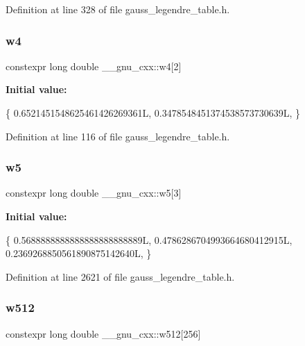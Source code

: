 Definition at line 328 of file gauss\+\_\+legendre\+\_\+table.\+h.

\mbox{\label{namespace____gnu__cxx_aed9d2cb808e1d273a3d11b6e1a3ac3f6}} 
\subsubsection{\texorpdfstring{w4}{w4}}
{\footnotesize\ttfamily constexpr long double \+\_\+\+\_\+gnu\+\_\+cxx\+::w4\mbox{[}2\mbox{]}}

{\bfseries Initial value\+:}
\begin{DoxyCode}
\{
    0.6521451548625461426269361L,
    0.3478548451374538573730639L,
  \}
\end{DoxyCode}


Definition at line 116 of file gauss\+\_\+legendre\+\_\+table.\+h.

\mbox{\label{namespace____gnu__cxx_ad45573427e2170859a26ed81066c8858}} 
\subsubsection{\texorpdfstring{w5}{w5}}
{\footnotesize\ttfamily constexpr long double \+\_\+\+\_\+gnu\+\_\+cxx\+::w5\mbox{[}3\mbox{]}}

{\bfseries Initial value\+:}
\begin{DoxyCode}
\{
    0.5688888888888888888888889L,
    0.4786286704993664680412915L,
    0.2369268850561890875142640L,
  \}
\end{DoxyCode}


Definition at line 2621 of file gauss\+\_\+legendre\+\_\+table.\+h.

\mbox{\label{namespace____gnu__cxx_aa0b9e3a86cfbee76c8d296f2ccdc968b}} 
\subsubsection{\texorpdfstring{w512}{w512}}
{\footnotesize\ttfamily constexpr long double \+\_\+\+\_\+gnu\+\_\+cxx\+::w512\mbox{[}256\mbox{]}}



